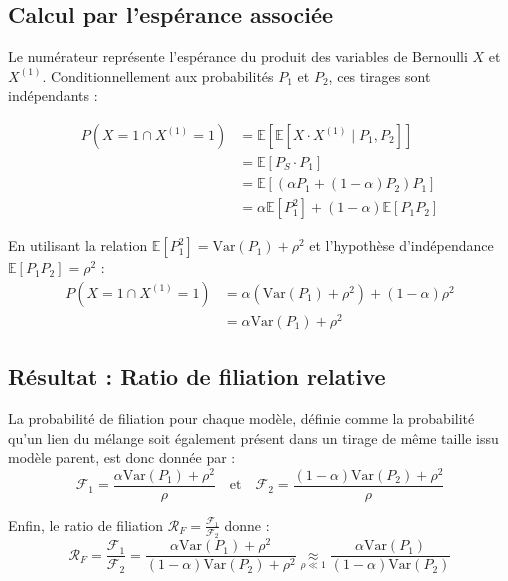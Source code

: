 \subsection*{Calcul par l'espérance associée}

Le numérateur représente l'espérance du produit des variables de Bernoulli $X$ et $X^{(1)}$. Conditionnellement aux probabilités $P_1$ et $P_2$, ces tirages sont indépendants :

\begin{align}
    P(X = 1 \cap X^{(1)} = 1) &= \mathbb{E}[ \mathbb{E}[X \cdot X^{(1)} \mid P_1, P_2] ] \nonumber \\
    &= \mathbb{E}[ P_S \cdot P_1 ] \nonumber \\
    &= \mathbb{E}[ (\alpha P_1 + (1-\alpha) P_2) P_1 ] \nonumber \\
    &= \alpha \mathbb{E}[P_1^2] + (1-\alpha) \mathbb{E}[P_1 P_2]
\end{align}

En utilisant la relation $\mathbb{E}[P_1^2] = \text{Var}(P_1) + \rho^2$ et l'hypothèse d'indépendance $\mathbb{E}[P_1 P_2] = \rho^2$ :
\begin{align}
    P(X = 1 \cap X^{(1)} = 1) &= \alpha (\text{Var}(P_1) + \rho^2) + (1-\alpha) \rho^2 \nonumber \\
    &= \alpha \text{Var}(P_1) + \rho^2
\end{align}

\subsection*{Résultat : Ratio de filiation relative}

La probabilité de filiation pour chaque modèle, définie comme la probabilité qu'un lien du mélange soit également présent dans un tirage de même taille issu modèle parent, est donc donnée par :
\begin{equation}
    \mathcal{F}_1 = \frac{\alpha \text{Var}(P_1) + \rho^2}{\rho} \quad \text{et} \quad \mathcal{F}_2 = \frac{(1-\alpha) \text{Var}(P_2) + \rho^2}{\rho}
\end{equation}

Enfin, le ratio de filiation $\mathcal{R}_F = \frac{\mathcal{F}_1}{\mathcal{F}_2}$ donne :
\begin{equation}
    \mathcal{R}_F = \frac{\mathcal{F}_1}{\mathcal{F}_2}  = \frac{\alpha \text{Var}(P_1) + \rho^2}{(1-\alpha) \text{Var}(P_2) + \rho^2} \underset{\rho \ll 1}{\approx} \frac{\alpha \text{Var}(P_1)}{(1-\alpha) \text{Var}(P_2)}
\end{equation}

